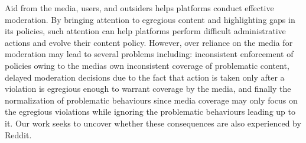  Aid from the media, users,
and outsiders helps platforms conduct effective moderation. By bringing
attention to egregious content and highlighting gaps in its policies, such
attention can help platforms perform difficult administrative actions and
evolve their content policy. However, over reliance on the media for moderation
may lead to several problems including: inconsistent enforcement of policies
owing to the medias own inconsistent coverage of problematic content, delayed
moderation decisions due to the fact that action is taken only after
a violation is egregious enough to warrant coverage by the media, and finally
the normalization of problematic behaviours since media coverage may only focus
on the egregious violations while ignoring the problematic behaviours leading
up to it. Our work seeks to uncover whether these consequences are also
experienced by Reddit.

